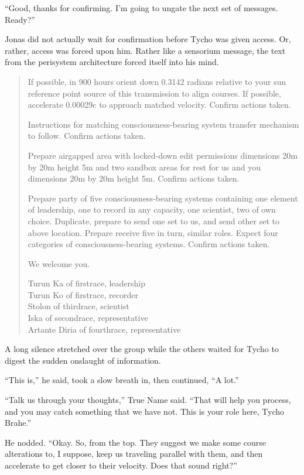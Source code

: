 ``Good, thanks for confirming. I'm going to ungate the next set of messages. Ready?''

Jonas did not actually wait for confirmation before Tycho was given access. Or, rather, access was forced upon him. Rather like a sensorium message, the text from the perisystem architecture forced itself into his mind.

\begin{quote}
If possible, in 900 hours orient down 0.3142 radians relative to your sun reference point source of this transmission to align courses. If possible, accelerate 0.00029c to approach matched velocity. Confirm actions taken.

Instructions for matching consciousness-bearing system transfer mechanism to follow. Confirm actions taken.

Prepare airgapped area with locked-down edit permissions dimensions 20m by 20m height 5m and two sandbox areas for rest for us and you dimensions 20m by 20m height 5m. Confirm actions taken.

Prepare party of five consciousness-bearing systems containing one element of leadership, one to record in any capacity, one scientist, two of own choice. Duplicate, prepare to send one set to us, and send other set to above location. Prepare receive five in turn, similar roles. Expect four categories of consciousness-bearing systems. Confirm actions taken.

We welcome you.

Turun Ka of firstrace, leadership\\
Turun Ko of firstrace, recorder\\
Stolon of thirdrace, scientist\\
Iska of secondrace, representative\\
Artante Diria of fourthrace, representative
\end{quote}

A long silence stretched over the group while the others waited for Tycho to digest the sudden onslaught of information.

``This is,'' he said, took a slow breath in, then continued, ``A lot.''

``Talk us through your thoughts,'' True Name said. ``That will help you process, and you may catch something that we have not. This is your role here, Tycho Brahe.''

He nodded. ``Okay. So, from the top. They suggest we make some course alterations to, I suppose, keep us traveling parallel with them, and then accelerate to get closer to their velocity. Does that sound right?''

